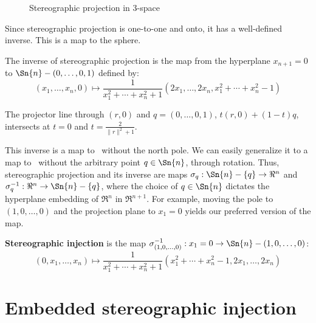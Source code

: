 \begin{figure}[ht]
\vspace{3in}
\caption{Stereographic projection in 3-space}
\label{fig:stereo}
\end{figure}


Since stereographic projection is one-to-one and onto,
it has a well-defined inverse.
This is a map to the sphere.
%
\begin{lemma}
The inverse of stereographic projection is the map from the hyperplane
$x_{n+1}=0$ to $\Sn{n} - (0,\ldots,0,1)$ defined by:
\[ (x_1,\ldots,x_n,0) \mapsto
	\frac{1}{x_1^2 + \cdots + x_n^2 + 1} 
	(2x_1, \ldots, 2x_n, x_1^2 + \cdots + x_n^2 - 1)
\]	%
\end{lemma}
\prf
The projector line through $(r,0)$ and $q = (0,\ldots,0,1)$, $t(r,0) + (1-t)q$,
intersects  at $t=0$ and $t=\frac{2}{\|r\|^2 + 1}$.
\QED

This inverse is a map to \ without the north pole.
We can easily generalize it to a map to \ 
without the arbitrary point $q \in \Sn{n}$, through rotation.
Thus, stereographic projection and its inverse are 
maps $\sigma_q: \Sn{n} - \{q\} \rightarrow \Re^n$
and $\sigma_q^{-1}: \Re^n \rightarrow \Sn{n} - \{q\}$,
where the choice of $q \in \Sn{n}$ dictates the hyperplane
embedding of $\Re^n$ in $\Re^{n+1}$.
For example, moving the pole to $(1,0,\ldots,0)$ and the projection
plane to $x_1=0$ yields our preferred version of the map.

\begin{defn2}
{\rm 
{\bf Stereographic injection} is the map 
$\sigma^{-1}_{(1,0,\ldots,0)}: x_{1}=0 \rightarrow \Sn{n} - (1,0,\ldots,0)$:
\begin{equation}
\label{eq:injection}
(0,x_1,\ldots,x_n) \mapsto
	\frac{1}{x_1^2 + \cdots + x_n^2 + 1} 
	(x_1^2 + \cdots + x_n^2 - 1, 2x_1, \ldots, 2x_n)
\end{equation}
}
\end{defn2}

\section{Embedded stereographic injection}
\label{sec1}

